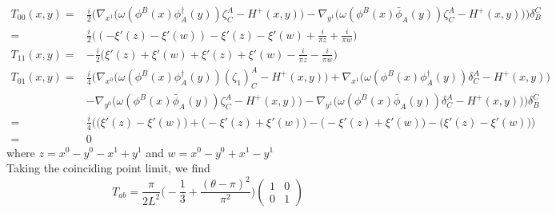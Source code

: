 \begin{equation}
\begin{split}
T_{00}(x,y) = 
& \frac{i}{2}\Big(\nabla_{x^1} \big( \omega(\phi^B(x) \phi^\dagger_A(y))\zeta^A_C - H^+(x,y) \big)
- \nabla_{y^1} \big( \omega( \phi^B(x) \bar{\phi}_A(y))\zeta^A_C - H^+(x,y) \big)
\Big)\delta_B^C  \\
= & \frac{i}{2} \big( (-\xi'(z) - \xi'(w)) - \xi'(z) - \xi'(w) + \frac{i}{\pi z} + \frac{i}{\pi w} \big)   \\
T_{11}(x,y) =
& - \frac{i}{2}\big( \xi'(z) + \xi'(w) + \xi'(z) + \xi'(w) - \frac{i}{\pi z} - \frac{i}{\pi w}\big) \\
T_{01}(x,y) = 
& \frac{i}{4}\Big(\nabla_{x^0} \big( \omega(\phi^B(x) \phi^\dagger_A(y))(\zeta_1)^A_C - H^+(x,y) \big) + \nabla_{x^1} \big( \omega(\phi^B(x) \phi^\dagger_A(y))\delta^A_C - H^+(x,y) \big)  \\
& - \nabla_{y^0} \big( \omega( \phi^B(x) \bar{\phi}_A(y))\zeta^A_C - H^+(x,y) \big)
- \nabla_{y^1} \big( \omega( \phi^B(x) \bar{\phi}_A(y))\delta^A_C - H^+(x,y) \big)
\Big)\delta_B^C \\
= & \frac{i}{4}\Big( \big( \xi'(z) - \xi'(w) \big) + \big(- \xi'(z) + \xi'(w) \big) - \big( - \xi'(z) + \xi'(w) \big) - \big( \xi'(z) - \xi'(w) \big) \Big) \\
= & 0
\end{split}
\end{equation}
where $z = x^0 - y^0 - x^1 + y^1$ and $w = x^0 - y^0 + x^1 - y^1$ \\
Taking the coinciding point limit, we find
\begin{equation}
T_{ab} = \frac{ \pi}{2 L^2} \big( -\frac{1}{3} + \frac{(\theta - \pi)^2}{\pi^2}\big)\begin{pmatrix}
1  & 0 \\ 0  &  1
\end{pmatrix}
\end{equation}



















